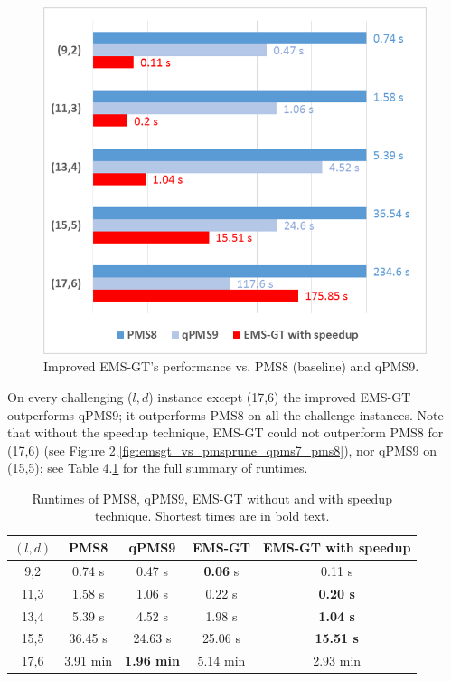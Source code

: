 \documentclass[oneside,12pt]{DISCSthesis}
\begin{document}
{		\begin{figure}[ht]\label{fig:results2}
			\centering
			\includegraphics[width=5.0in]{img/emsgt-with-speedup-vs-PMS,qPMS9}
			\caption{Improved EMS-GT's performance vs. PMS8 (baseline) and qPMS9.}
			\end{figure}

		On every challenging ($l,d$) instance except (17,6) the improved EMS-GT outperforms qPMS9; it outperforms PMS8 on all the challenge instances. Note that without the speedup technique, EMS-GT could not outperform PMS8 for (17,6) (see Figure 2.\ref{fig:emsgt_vs_pmsprune_qpms7_pms8}), nor qPMS9 on (15,5);
		see Table 4.\ref{tbl:all_runtimes} for the full summary of runtimes.

		\begin{table}[ht] \label{tbl:all_runtimes}
			\renewcommand{\arraystretch}{1.3}
			\centering
			\begin{tabular}{|c|c|c|c|c|}
			\hline \bfseries\boldmath $(l,d)$ & \bfseries PMS8 & \bfseries qPMS9 & \bfseries EMS-GT & \bfseries EMS-GT with speedup\\
			\hline
			 9,2 &  0.74 s  &  0.47 s & {\bf 0.06 }s & {    0.11 s}\\
			11,3 &  1.58 s  &  1.06 s &  0.22 s & {\bf 0.20 s}\\
			13,4 &  5.39 s  &  4.52 s &  1.98 s & {\bf 1.04 s}\\
			15,5 & 36.45 s  & 24.63 s & 25.06 s & {\bf15.51 s}\\
			17,6 &  3.91 min & \textbf{1.96 min} & 5.14 min & {2.93 min}\\
			\hline\end{tabular}
			\caption{Runtimes of PMS8, qPMS9, EMS-GT without and with speedup technique. Shortest times are in bold text.}
			\end{table}

}
\end{document}
